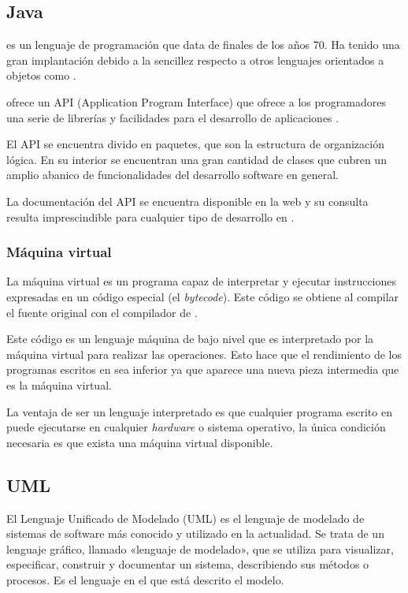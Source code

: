 \subsection{Java}
\java{} es un lenguaje de programación que data de finales de los años 70. Ha tenido una gran implantación debido a la sencillez respecto a otros lenguajes orientados a objetos como \cpp{}.

\java{} ofrece un API (Application Program Interface) que ofrece a los programadores una serie de librerías y facilidades para el desarrollo de aplicaciones \java{}.

El API se encuentra divido en paquetes, que son la estructura de organización lógica. En su interior se encuentran una gran cantidad de clases que cubren un amplio abanico de funcionalidades del desarrollo software en general.

La documentación del API se encuentra disponible en la web y su consulta resulta imprescindible para cualquier tipo de desarrollo en \java{}.

\subsubsection*{Máquina virtual}
La máquina virtual es un programa capaz de interpretar y ejecutar instrucciones expresadas en un código especial (el \java{} \textit{bytecode}). Este código se obtiene al compilar el fuente original con el compilador de \java{}.

Este código es un lenguaje máquina de bajo nivel que es interpretado por la máquina virtual para realizar las operaciones. Esto hace que el rendimiento de los programas escritos en \java{} sea inferior ya que aparece una nueva pieza intermedia que es la máquina virtual.

La ventaja de ser un lenguaje interpretado es que cualquier programa escrito en \java{} puede ejecutarse en cualquier \textit{hardware} o sistema operativo, la única condición necesaria es que exista una máquina virtual disponible.

\subsection{UML}
El Lenguaje Unificado de Modelado (UML) \cite{fowler1999uml} es el lenguaje de modelado de sistemas de software más conocido y utilizado en la actualidad. Se trata de un lenguaje gráfico, llamado «lenguaje de modelado», que se utiliza para visualizar, especificar, construir y documentar un sistema, describiendo sus métodos o procesos. Es el lenguaje en el que está descrito el modelo.

